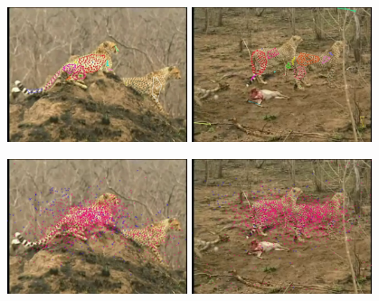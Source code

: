 \begin{figure}
\centering
\includegraphics[width=0.47\textwidth,bb=0 0 640 480]{amotionimg00296.jpg}
\includegraphics[width=0.47\textwidth,bb=0 0 640 480]{amotionimg01836.jpg}

\includegraphics[width=0.47\textwidth,bb=0 0 640 480]{selectVimg00296_0.jpg}
\includegraphics[width=0.47\textwidth,bb=0 0 640 480]{selectVimg01836_0.jpg}


\end{figure}
